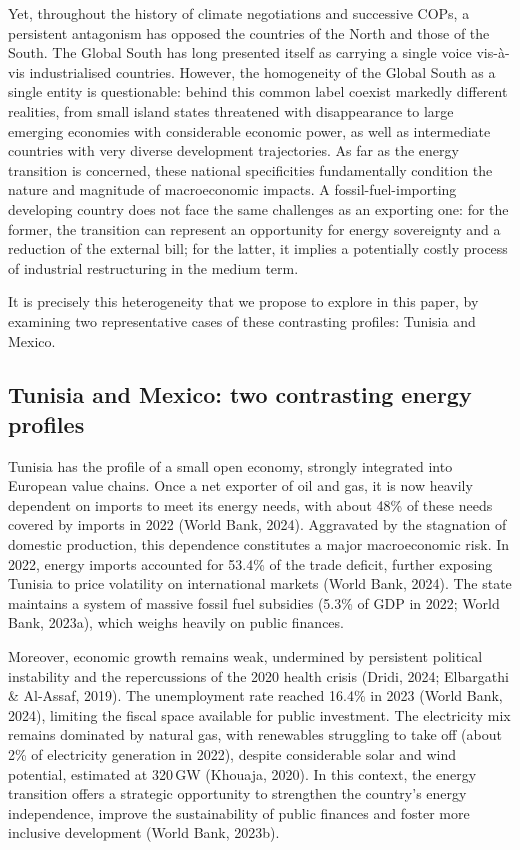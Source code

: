 \documentclass[12pt, a4paper]{article}
\begin{document}
Yet, throughout the history of climate negotiations and successive COPs, a persistent antagonism has opposed the countries of the North and those of the South. The Global South has long presented itself as carrying a single voice vis-à-vis industrialised countries. However, the homogeneity of the Global South as a single entity is questionable: behind this common label coexist markedly different realities, from small island states threatened with disappearance to large emerging economies with considerable economic power, as well as intermediate countries with very diverse development trajectories. As far as the energy transition is concerned, these national specificities fundamentally condition the nature and magnitude of macroeconomic impacts. A fossil-fuel-importing developing country does not face the same challenges as an exporting one: for the former, the transition can represent an opportunity for energy sovereignty and a reduction of the external bill; for the latter, it implies a potentially costly process of industrial restructuring in the medium term.

It is precisely this heterogeneity that we propose to explore in this paper, by examining two representative cases of these contrasting profiles: Tunisia and Mexico.

\subsection{Tunisia and Mexico: two contrasting energy profiles}

Tunisia has the profile of a small open economy, strongly integrated into European value chains. Once a net exporter of oil and gas, it is now heavily dependent on imports to meet its energy needs, with about 48\% of these needs covered by imports in 2022 (World Bank, 2024). Aggravated by the stagnation of domestic production, this dependence constitutes a major macroeconomic risk. In 2022, energy imports accounted for 53.4\% of the trade deficit, further exposing Tunisia to price volatility on international markets (World Bank, 2024). The state maintains a system of massive fossil fuel subsidies (5.3\% of GDP in 2022; World Bank, 2023a), which weighs heavily on public finances.

Moreover, economic growth remains weak, undermined by persistent political instability and the repercussions of the 2020 health crisis (Dridi, 2024; Elbargathi \& Al-Assaf, 2019). The unemployment rate reached 16.4\% in 2023 (World Bank, 2024), limiting the fiscal space available for public investment. The electricity mix remains dominated by natural gas, with renewables struggling to take off (about 2\% of electricity generation in 2022), despite considerable solar and wind potential, estimated at 320\,GW (Khouaja, 2020). In this context, the energy transition offers a strategic opportunity to strengthen the country's energy independence, improve the sustainability of public finances and foster more inclusive development (World Bank, 2023b).
\end{document}
